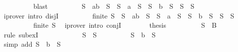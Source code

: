 \begin{isabellebody}
\ \ \ \ \ \ \ \ \isamarkupfalse%
\ blast\isanewline
\ \ \ \ \ \ \isamarkupfalse%
\ \isamarkupfalse%
\ {\isachardoublequoteopen}S\ {\isacharequal}\ {\isacharbraceleft}a{\isacharcomma}b{\isacharbraceright}\ {\isasymunion}\ S{}\ {\isasymor}\ S\ {\isacharequal}\ {\isacharbraceleft}a{\isacharbraceright}\ {\isasymunion}\ S{}\ {\isasymor}\ S\ {\isacharequal}\ {\isacharbraceleft}b{\isacharbraceright}\ {\isasymunion}\ S{}\ {\isasymor}\ S\ {\isacharequal}\ S{}{\isachardoublequoteclose}\isanewline
\ \ \ \ \ \ \ \ \isamarkupfalse%
\ {\isacharparenleft}iprover\ intro{\isacharcolon}\ disjI{}{\isacharparenright}\isanewline
\ \ \ \ \ \ \isamarkupfalse%
\ \isamarkupfalse%
\ {\isachardoublequoteopen}finite\ S{}\ {\isasymand}\ {\isacharparenleft}S\ {\isacharequal}\ {\isacharbraceleft}a{\isacharcomma}b{\isacharbraceright}\ {\isasymunion}\ S{}\ {\isasymor}\ S\ {\isacharequal}\ {\isacharbraceleft}a{\isacharbraceright}\ {\isasymunion}\ S{}\ {\isasymor}\ S\ {\isacharequal}\ {\isacharbraceleft}b{\isacharbraceright}\ {\isasymunion}\ S{}\ {\isasymor}\ S\ {\isacharequal}\ S{}{\isacharparenright}{\isachardoublequoteclose}\isanewline
\ \ \ \ \ \ \ \ \isamarkupfalse%
\ {\isacartoucheopen}finite\ S{}{\isacartoucheclose}\ \isamarkupfalse%
\ {\isacharparenleft}iprover\ intro{\isacharcolon}\ conjI{\isacharparenright}\isanewline
\ \ \ \ \ \ \isamarkupfalse%
\ {\isacharquery}thesis\isanewline
\ \ \ \ \ \ \ \ \isamarkupfalse%
\ {\isacartoucheopen}S{}\ {\isasymsubseteq}\ B{\isacartoucheclose}\ \isamarkupfalse%
\ {\isacharparenleft}rule\ subexI{\isacharparenright}\isanewline
\ \ \ \ \isamarkupfalse%
\isanewline
\ \ \ \ \ \ \isamarkupfalse%
\ {\isachardoublequoteopen}S\ {\isacharequal}\ S{}{\isachardoublequoteclose}\isanewline
\ \ \ \ \ \ \isamarkupfalse%
\ \isamarkupfalse%
\ {\isachardoublequoteopen}S\ {\isacharequal}\ {\isacharbraceleft}b{\isacharbraceright}\ {\isasymunion}\ S{}{\isachardoublequoteclose}\isanewline
\ \ \ \ \ \ \ \ \isamarkupfalse%
\ {\isacharparenleft}simp\ add{\isacharcolon}\ {\isacartoucheopen}S{}\ {\isacharequal}\ {\isacharbraceleft}b{\isacharbraceright}\ {\isasymunion}\ S{}{\isacartoucheclose}{\isacharparenright}\isanewline

\end{isabellebody}
